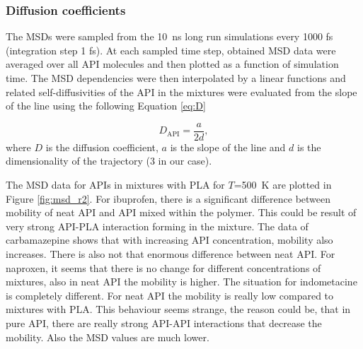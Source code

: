 \subsubsection{Diffusion coefficients}
The MSDs were sampled from the 10~ns long run simulations every 1000 fs (integration step 1 fs). At each sampled time step, obtained MSD data were averaged over all API molecules and then plotted as a function of simulation time. The MSD dependencies were then interpolated by a linear functions and related self-diffusivities of the API in the mixtures were evaluated from the slope of the line using the following Equation \ref{eq:D}

\begin{equation}\label{eq:D}
	D_{\text{API}} = \frac{a}{2d}, 
\end{equation}
where $D$ is the diffusion coefficient, $a$ is the slope of the line and $d$ is the dimensionality of the trajectory (3 in our case).

The MSD data for APIs in mixtures with PLA for $T$=500~K are plotted in Figure \ref{fig:msd_r2}. For ibuprofen, there is a significant difference between mobility of neat API and API mixed within the polymer. This could be result of very strong API-PLA interaction forming in the mixture. The data of carbamazepine shows that with increasing API concentration, mobility also increases. There is also not that enormous difference between neat API. For naproxen, it seems that there is no change for different concentrations of mixtures, also in neat API the mobility is higher. The situation for indometacine is completely different. For neat API the mobility is really low compared to mixtures with PLA. This behaviour seems strange, the reason could be, that in pure API, there are really strong API-API interactions that decrease the mobility. Also the MSD values are much lower.


